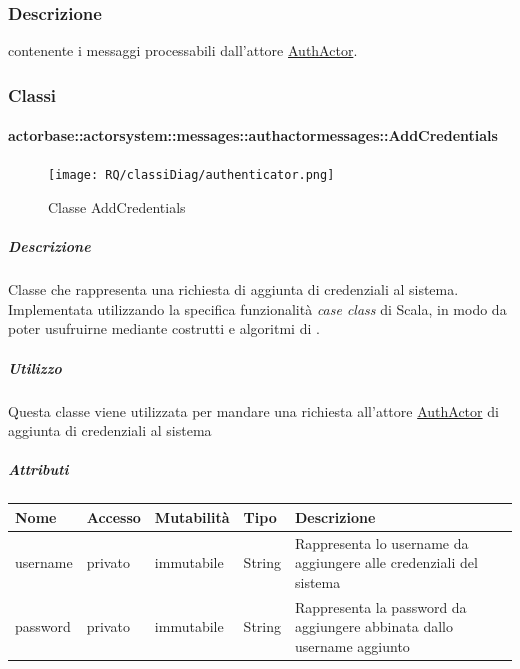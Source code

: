 \documentclass{scalatekids-article}
\begin{document}
\subsubsection{Descrizione}
 contenente i messaggi processabili dall'attore \hyperref[sec:actorbase::actorsystem::actors::authactor::AuthActor]{AuthActor}.

\subsubsection{Classi}

\paragraph{actorbase::actorsystem::messages::authactormessages::AddCredentials}
\label{sec:actorbase::actorsystem::messages::authactormessages::AddCredentials}

\begin{figure}[H]
  \begin{center}
    \texttt{[image: RQ/classiDiag/authenticator.png]}
    \caption{Classe AddCredentials}
  \end{center}
\end{figure}

\subparagraph{Descrizione}
Classe che rappresenta una richiesta di aggiunta di credenziali al sistema.\\Implementata utilizzando la specifica funzionalità \textit{case class} di Scala,
in modo da poter usufruirne mediante costrutti e algoritmi di
.

\subparagraph{Utilizzo}
Questa classe viene utilizzata per mandare una richiesta all'attore
\hyperref[sec:actorbase::actorsystem::messages::authactormessages::AuthActor]{AuthActor}
di aggiunta di credenziali al sistema

\subparagraph{Attributi}
\begin{tabular}{| p{2cm} | p{1.5cm} | p{2cm} | p{3cm} | p{8.5cm} |}
  \hline
  Nome & Accesso & Mutabilità & Tipo & Descrizione\\
  \hline
  username & privato & immutabile & String & Rappresenta lo username da aggiungere alle credenziali del sistema \\
  \hline
  password & privato & immutabile & String & Rappresenta la password da aggiungere abbinata dallo username aggiunto \\
  \hline
\end{tabular}
\end{document}
